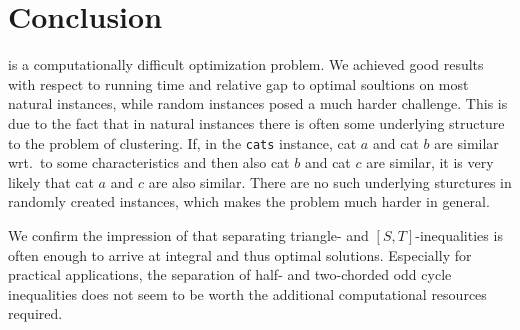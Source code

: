 \section{Conclusion}\label{sec:discussion}
\CP is a computationally difficult optimization problem.
We achieved good results with respect to running time and relative gap to optimal soultions on most natural instances,
while random instances posed a much harder challenge.
This is due to the fact that in natural instances there is often some underlying structure to the problem of clustering.
If, \eg in the \texttt{cats} instance, cat $a$ and cat $b$ are similar wrt.\ to some characteristics and then also cat $b$ and cat $c$ are similar,
it is very likely that cat $a$ and $c$ are also similar.
There are no such underlying sturctures in randomly created instances, which makes the problem much harder in general.

We confirm the impression of \cite{grotschelCuttingPlaneAlgorithm1989} that separating triangle- and $\left[ S,T \right]$-inequalities is often enough to arrive at integral and thus optimal solutions.
Especially for practical applications, the separation of half- and two-chorded odd cycle inequalities does not seem to be worth the additional computational resources required.
